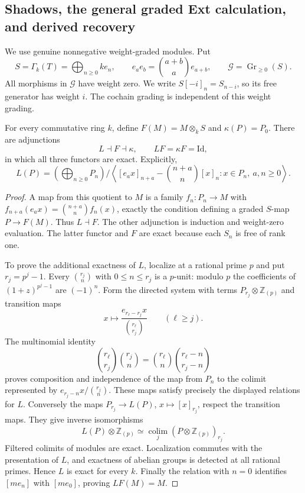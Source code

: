 \subsection{Shadows, the general graded Ext calculation, and derived recovery}

We use genuine nonnegative weight-graded modules. Put
\[
 S=\Gamma_k(T)=\bigoplus_{n\geq0}ke_n,
 \qquad e_ae_b=\binom{a+b}{a}e_{a+b},
 \qquad\mathcal G=\operatorname{Gr}_{\geq0}(S).
\]
All morphisms in $\mathcal G$ have weight zero. We write
$S[-i]_n=S_{n-i}$, so its free generator has weight $i$.
The cochain grading is independent of this weight grading.

\begin{theorem}
\label{sa08:D001}
For every commutative ring $k$, define $F(M)=M\otimes_kS$ and
$\kappa(P)=P_0$. There are adjunctions
\[
 L\dashv F\dashv\kappa,
 \qquad LF=\kappa F=\mathrm{Id},
\]
in which all three functors are exact. Explicitly,
\[
 L(P)=\left(\bigoplus_{n\geq0}P_n\right)\Big/
 \left\langle [e_ax]_{n+a}-\binom{n+a}{n}[x]_n
       :x\in P_n,\ a,n\geq0\right\rangle .
\]
\end{theorem}
\begin{proof}
A map from this quotient to $M$ is a family $f_n:P_n\to M$ with
$f_{n+a}(e_ax)=\binom{n+a}{n}f_n(x)$, exactly the condition defining
a graded $S$-map $P\to F(M)$. Thus $L\dashv F$. The other
adjunction is induction and weight-zero evaluation. The latter
functor and $F$ are exact because each $S_n$ is free of rank one.

To prove the additional exactness of $L$, localize at a rational
prime $p$ and put $r_j=p^j-1$. Every $\binom{r_j}{n}$ with
$0\leq n\leq r_j$ is a $p$-unit: modulo $p$ the coefficients of
$(1+z)^{p^j-1}$ are $(-1)^n$. Form the directed system with terms
$P_{r_j}\otimes\mathbb Z_{(p)}$ and transition maps
\[
 x\longmapsto\frac{e_{r_\ell-r_j}x}{\binom{r_\ell}{r_j}}
 \qquad(\ell\geq j).
\]
The multinomial identity
\[
 \binom{r_\ell}{r_j}\binom{r_j}{n}
 =\binom{r_\ell}{n}\binom{r_\ell-n}{r_j-n}
\]
proves composition and independence of the map from $P_n$ to the
colimit represented by $e_{r_j-n}x/\binom{r_j}{n}$. These maps
satisfy precisely the displayed relations for $L$. Conversely the
maps $P_{r_j}\to L(P)$, $x\mapsto[x]_{r_j}$, respect the transition
maps. They give inverse isomorphisms
\[
 L(P)\otimes\mathbb Z_{(p)}
 \simeq\operatorname*{colim}_j(P\otimes\mathbb Z_{(p)})_{r_j}.
\]
Filtered colimits of modules are exact. Localization commutes with
the presentation of $L$, and exactness of abelian groups is detected
at all rational primes. Hence $L$ is exact for every $k$. Finally the
relation with $n=0$ identifies $[me_n]$ with $[me_0]$, proving
$LF(M)=M$.
\end{proof}

